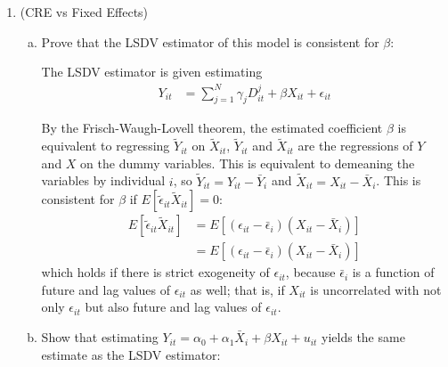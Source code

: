 \documentclass[11pt]{article}
\begin{document}
\begin{center}
\end{center}

\begin{enumerate}[1)]
	\item (CRE vs Fixed Effects)

	\begin{enumerate}[(a)]
	
		\item Prove that the LSDV estimator of this model is consistent for $\beta$:

		The LSDV estimator is given estimating
		\begin{align*}
		 	Y_{it} &= \sum_{j=1}^N \gamma_j D^j_{it} + \beta X_{it} + \epsilon_{it}
		\end{align*}

		By the Frisch-Waugh-Lovell theorem, the estimated coefficient $\beta$ is equivalent to regressing $\tilde{Y}_{it}$ on $\tilde{X}_{it}$, $\tilde{Y}_{it}$ and $\tilde{X}_{it}$ are the regressions of $Y$ and $X$ on the dummy variables. This is equivalent to demeaning the variables by individual $i$, so $\tilde{Y}_{it} = Y_{it} - \bar{Y}_i$ and $\tilde{X}_{it} = X_{it} - \bar{X}_i$. This is consistent for $\beta$ if $E[\tilde{\epsilon}_{it} \tilde{X}_{it}] = 0$:
		\begin{align*}
			E[\tilde{\epsilon}_{it} \tilde{X}_{it}] &= E[(\epsilon_{it} - \bar{\epsilon}_i) (X_{it} - \bar{X}_i)] \\
			&= E[(\epsilon_{it} - \bar{\epsilon}_i) (X_{it} - \bar{X}_i)]
		\end{align*}
		which holds if there is strict exogeneity of $\epsilon_{it}$, because $\bar{\epsilon}_i$ is a function of future and lag values of $\epsilon_{it}$ as well; that is, if $X_{it}$ is uncorrelated with not only $\epsilon_{it}$ but also future and lag values of $\epsilon_{it}$.

		\item Show that estimating $Y_{it} = \alpha_0 + \alpha_1 \bar{X}_i + \beta X_{it} + u_{it}$ yields the same estimate as the LSDV estimator:


\end{enumerate}
\end{enumerate}
\end{document}
